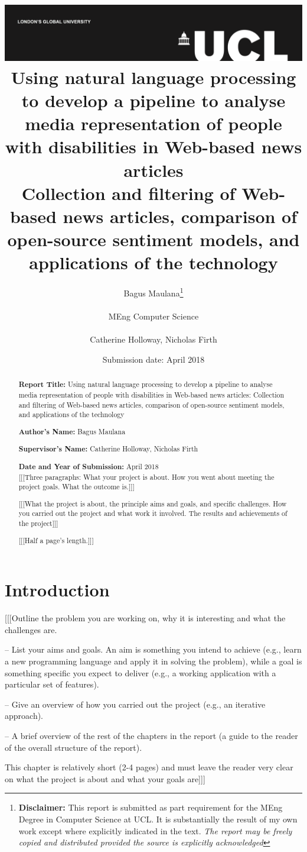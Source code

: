 \documentclass{report}
\title{{\vspace{-14em} \includegraphics[scale=0.4]{ucl_logo.png}}\\
{{\Huge Using natural language processing to develop a pipeline to analyse media representation of people with disabilities in Web-based news articles}}\\
{\large Collection and filtering of Web-based news articles, comparison of open-source sentiment models, and applications of the technology
}\\
}
\date{Submission date: \nth{30} April 2018}
\author{Bagus Maulana\thanks{
{\bf Disclaimer:}
This report is submitted as part requirement for the MEng Degree in Computer Science at UCL. It is
substantially the result of my own work except where explicitly indicated in the text.
\emph{The report may be freely copied and distributed provided the source is explicitly acknowledged}}
\\ \\
MEng Computer Science\\ \\
Catherine Holloway, Nicholas Firth}
\begin{document}
 
\onehalfspacing
\maketitle
\begin{abstract}

\textbf{Report Title:}  Using natural language processing to develop a pipeline to analyse media representation of people with disabilities in Web-based news articles: Collection and filtering of Web-based news articles, comparison of open-source sentiment models, and applications of the technology

\textbf{Author’s Name:} Bagus Maulana

\textbf{Supervisor’s Name:} Catherine Holloway, Nicholas Firth

\textbf{Date and Year of Submission:}  April 2018\\

[[[Three paragraphs:
What your project is about.
How you went about meeting the project goals.
What the outcome is.]]]

[[[What the project is about, the principle aims and goals, and specific challenges.
How you carried out the project and what work it involved.
The results and achievements of the project]]]

[[[Half a page’s length.]]]
\end{abstract}
\tableofcontents
\setcounter{page}{1}


\chapter{Introduction}

[[[Outline the problem you are working on, why it is interesting and what the challenges are.

– List your aims and goals. An aim is something you intend to achieve (e.g., learn a new programming language and apply it in solving the problem), while a goal is something specific you expect to deliver (e.g., a working application with a particular set of features).

– Give an overview of how you carried out the project (e.g., an iterative approach).

– A brief overview of the rest of the chapters in the report (a guide to the reader of the overall structure of the report).

This chapter is relatively short (2-4 pages) and must leave the reader very clear on what the project is about and what your goals are]]]
\end{document}
